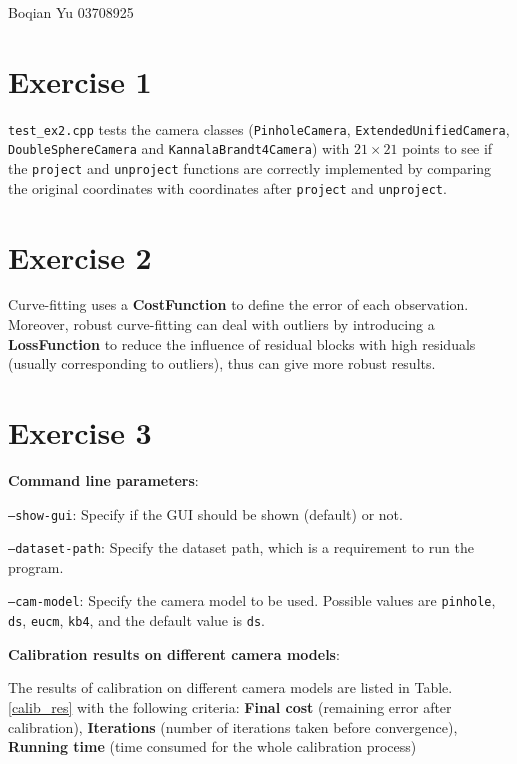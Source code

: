 \documentclass[a4paper, 12pt]{article}
\begin{document}
    Boqian Yu 03708925
	\section{Exercise 1}
        \texttt{test\_ex2.cpp} tests the camera classes (\texttt{PinholeCamera}, \texttt{ExtendedUnifiedCamera}, \texttt{DoubleSphereCamera} and \texttt{KannalaBrandt4Camera}) with $21\times 21$ points to see if the \texttt{project} and \texttt{unproject} functions are correctly implemented by comparing the original coordinates with coordinates after \texttt{project} and \texttt{unproject}.
    
    \section{Exercise 2}
        Curve-fitting uses a \textbf{CostFunction} to define the error of each observation. Moreover, robust curve-fitting can deal with outliers by introducing a \textbf{LossFunction} to reduce the influence of residual blocks with high residuals (usually corresponding to outliers), thus can give more robust results.
    
    \section{Exercise 3}
        \textbf{Command line parameters}:
        
        \texttt{--show-gui}: Specify if the GUI should be shown (default) or not.
        
        \texttt{--dataset-path}: Specify the dataset path, which is a requirement to run the program.
        
        \texttt{--cam-model}: Specify the camera model to be used. Possible values are \texttt{pinhole}, \texttt{ds}, \texttt{eucm}, \texttt{kb4}, and the default value is \texttt{ds}.
        
        \textbf{Calibration results on different camera models}:
        
        The results of calibration on different camera models are listed in Table.\ref{calib_res} with the following criteria: \textbf{Final cost} (remaining error after calibration), \textbf{Iterations} (number of iterations taken before convergence), \textbf{Running time} (time consumed for the whole calibration process)
        
\end{document}
